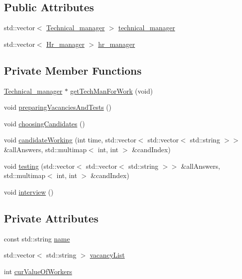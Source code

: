 \subsection*{Public Attributes}
\begin{DoxyCompactItemize}
\item 
std\+::vector$<$ \hyperlink{class_technical__manager}{Technical\+\_\+manager} $>$ \hyperlink{class_it__company_af2285094fb07bcf0a9f3a4c1d8a407d3}{technical\+\_\+manager}
\item 
std\+::vector$<$ \hyperlink{class_hr__manager}{Hr\+\_\+manager} $>$ \hyperlink{class_it__company_ae0e3f81754b1433c6dfb5ebe96f620d1}{hr\+\_\+manager}
\end{DoxyCompactItemize}
\subsection*{Private Member Functions}
\begin{DoxyCompactItemize}
\item 
\hyperlink{class_technical__manager}{Technical\+\_\+manager} $\ast$ \hyperlink{class_it__company_aa0b755bdb8d21b72bc42403b90b62898}{get\+Tech\+Man\+For\+Work} (void)
\item 
void \hyperlink{class_it__company_ab5f464351646bc6458640391f5eab298}{preparing\+Vacancies\+And\+Tests} ()
\item 
void \hyperlink{class_it__company_aead10e44d7215787e8e532e2e0463d0d}{choosing\+Candidates} ()
\item 
void \hyperlink{class_it__company_aaca00d2170e5b58ec725a35afb0f4b59}{candidate\+Working} (int time, std\+::vector$<$ std\+::vector$<$ std\+::string $>$$>$ \&all\+Answers, std\+::multimap$<$ int, int $>$ \&cand\+Index)
\item 
void \hyperlink{class_it__company_a2c7a94d7f82fb700c0d1f369423ad45f}{testing} (std\+::vector$<$ std\+::vector$<$ std\+::string $>$$>$ \&all\+Answers, std\+::multimap$<$ int, int $>$ \&cand\+Index)
\item 
void \hyperlink{class_it__company_a0d05d1b25d00b221bbb66e57332dea08}{interview} ()
\end{DoxyCompactItemize}
\subsection*{Private Attributes}
\begin{DoxyCompactItemize}
\item 
const std\+::string \hyperlink{class_it__company_a99894304639dab6b416f697dc7e81d52}{name}
\item 
std\+::vector$<$ std\+::string $>$ \hyperlink{class_it__company_a06d700346a5bcd94c1f265f3bb65143f}{vacancy\+List}
\item 
int \hyperlink{class_it__company_ac48dbef2db2cad83837c89efdc69b9c9}{cur\+Value\+Of\+Workers}
\end{DoxyCompactItemize}
